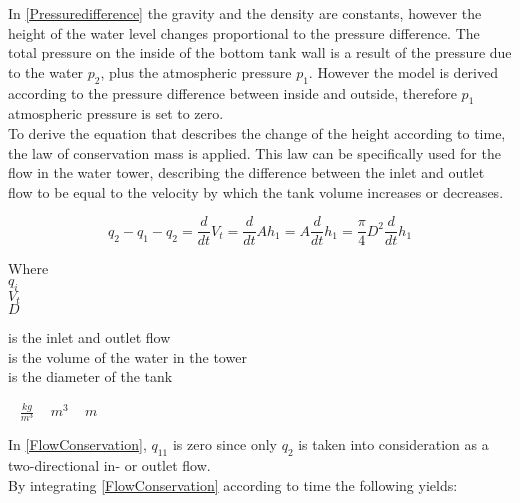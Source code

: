 In \eqref{Pressuredifference} the gravity and the density are constants, however the height of the water level changes proportional to the pressure difference. The total pressure on the inside of the bottom tank wall is a result of the pressure due to the water $p_2$, plus the
atmospheric pressure $p_1$. However the model is derived according to the pressure difference between inside and outside, therefore $p_1$ atmospheric pressure is set to zero. 
\\
To derive the equation that describes the change of the height according to 
time, the law of conservation mass is applied. This law can be specifically used for the flow in the water tower, describing the difference between the inlet and outlet flow to be equal to the velocity by which the tank volume increases or decreases. 


\begin{equation}
  q_{2} - q_{1} - q_2 = \frac{d}{dt}V_t = \frac{d}{dt}Ah_1 = A \frac{d}{dt}h_1 = \frac{\pi}{4} D^2 \frac{d}{dt} h_1
  \label{FlowConservation}
\end{equation}


\begin{minipage}[t]{0.20\textwidth}
Where\\
\hspace*{8mm} $q_i$ \\
\hspace*{8mm} $V_t$ \\
\hspace*{8mm} $D$ 
\end{minipage}
\begin{minipage}[t]{0.68\textwidth}
\vspace*{2mm}
is the inlet and outlet flow\\
is the volume of the water in the tower\\
is the diameter of the tank 
\end{minipage}
\begin{minipage}[t]{0.10\textwidth}
\vspace*{2mm}
\textcolor{White}{te}$\unit{\frac{kg}{m^3}}$
\textcolor{White}{te}$\unit{m^3}$
\textcolor{White}{te}$\unit{m}$
\end{minipage}

In \eqref{FlowConservation}, $q_11$ is zero since only $q_2$ is taken into consideration as a two-directional in- or outlet flow. 
\\
By integrating \eqref{FlowConservation} according to time the following yields:

